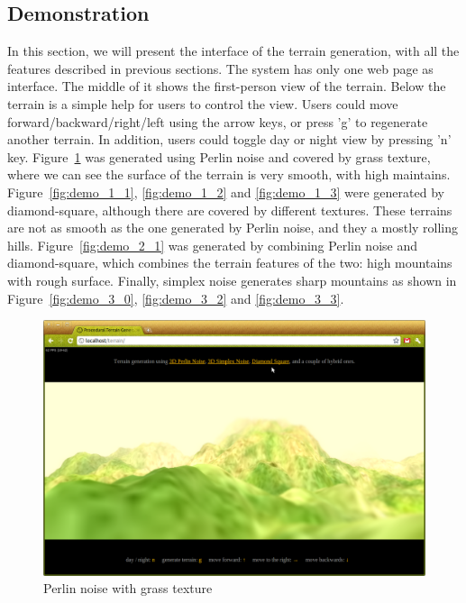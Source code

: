 \subsection{Demonstration}
In this section, we will present the interface of the terrain generation, with all the features described in previous sections. The system has only one web page as interface. The middle of it shows the first-person view of the terrain. Below the terrain is a simple help for users to control the view. Users could move forward/backward/right/left using the arrow keys, or press 'g' to regenerate another terrain. In addition, users could toggle day or night view by pressing 'n' key. Figure~\ref{fig:demo_0_1} was generated using Perlin noise and covered by grass texture, where we can see the surface of the terrain is very smooth, with high maintains. Figure~\ref{fig:demo_1_1}, \ref{fig:demo_1_2} and \ref{fig:demo_1_3} were generated by diamond-square, although there are covered by different textures. These terrains are not as smooth as the one generated by Perlin noise, and they a mostly rolling hills. Figure~\ref{fig:demo_2_1} was generated by combining Perlin noise and diamond-square, which combines the terrain features of the two: high mountains with rough surface. Finally, simplex noise generates sharp mountains as shown in Figure~\ref{fig:demo_3_0}, \ref{fig:demo_3_2} and \ref{fig:demo_3_3}.
\begin{figure}
	\center
	\includegraphics[scale=0.4]{demo_0_1.png}
	\caption{Perlin noise with grass texture}
	\label{fig:demo_0_1}
\end{figure}

